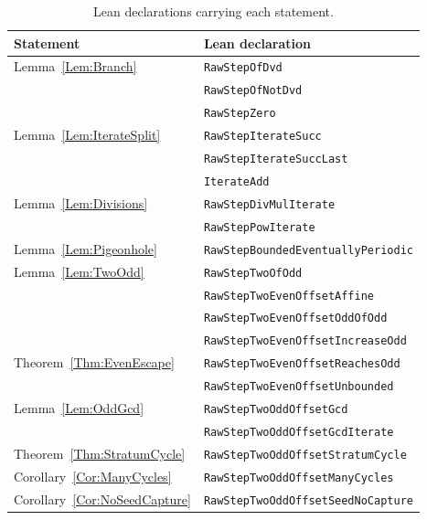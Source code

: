 \documentclass[11pt,letterpaper]{article}
\begin{document}
\begin{table}[htbp]
\centering
\begin{tabular}{ll}
\toprule
Statement & Lean declaration \\
\midrule
Lemma~\ref{Lem:Branch} & \texttt{RawStepOfDvd} \\
 & \texttt{RawStepOfNotDvd} \\
 & \texttt{RawStepZero} \\
Lemma~\ref{Lem:IterateSplit} & \texttt{RawStepIterateSucc} \\
 & \texttt{RawStepIterateSuccLast} \\
 & \texttt{IterateAdd} \\
Lemma~\ref{Lem:Divisions} & \texttt{RawStepDivMulIterate} \\
 & \texttt{RawStepPowIterate} \\
Lemma~\ref{Lem:Pigeonhole} & \texttt{RawStepBoundedEventuallyPeriodic} \\
Lemma~\ref{Lem:TwoOdd} & \texttt{RawStepTwoOfOdd} \\
 & \texttt{RawStepTwoEvenOffsetAffine} \\
 & \texttt{RawStepTwoEvenOffsetOddOfOdd} \\
 & \texttt{RawStepTwoEvenOffsetIncreaseOdd} \\
Theorem~\ref{Thm:EvenEscape} & \texttt{RawStepTwoEvenOffsetReachesOdd} \\
 & \texttt{RawStepTwoEvenOffsetUnbounded} \\
Lemma~\ref{Lem:OddGcd} & \texttt{RawStepTwoOddOffsetGcd} \\
 & \texttt{RawStepTwoOddOffsetGcdIterate} \\
Theorem~\ref{Thm:StratumCycle} & \texttt{RawStepTwoOddOffsetStratumCycle} \\
Corollary~\ref{Cor:ManyCycles} & \texttt{RawStepTwoOddOffsetManyCycles} \\
Corollary~\ref{Cor:NoSeedCapture} & \texttt{RawStepTwoOddOffsetSeedNoCapture} \\
\bottomrule
\end{tabular}
\caption{Lean declarations carrying each statement.}
\end{table}
\end{document}
